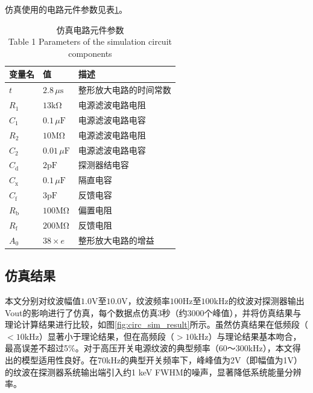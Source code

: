 \documentclass{ctexart}
\begin{document}
仿真使用的电路元件参数见表\ref{tab:params}。

\begin{table}[!h]
    \centering
    \caption{仿真电路元件参数 \\ Table 1 Parameters of the simulation circuit components}
    \label{tab:params}
    \begin{tabular}{lll}
        \hline
        变量名 & 值 & 描述 \\
        \hline
        $t$ & $2.8\,\mu\mathrm{s}$ & 整形放大电路的时间常数 \\
        $R_1$ & $13 \mathrm{k\Omega}$ & 电源滤波电路电阻 \\
        $C_1$ & $0.1\,\mu\mathrm{F}$ & 电源滤波电路电容 \\
        $R_2$ & $10 \mathrm{M\Omega}$ & 电源滤波电路电阻 \\
        $C_2$ & $0.01\,\mu\mathrm{F}$ & 电源滤波电路电容 \\
        $C_{\mathrm{d}}$ & $2\text{pF}$ & 探测器结电容 \\
        $C_{\mathrm{x}}$ & $0.1\,\mu\mathrm{F}$ & 隔直电容 \\
        $C_{\mathrm{f}}$ & $3 \mathrm{pF}$ & 反馈电容 \\
        $R_{\mathrm{b}}$ & $100 \mathrm{M\Omega}$ & 偏置电阻 \\
        $R_{\mathrm{f}}$ & $200 \mathrm{M\Omega}$ & 反馈电阻 \\
        $A_0$ & $38 \times e$ & 整形放大电路的增益 \\
        \hline
    \end{tabular}
\end{table}

\subsection{仿真结果}

本文分别对纹波幅值$1.0\mathrm{V}$至$10.0\mathrm{V}$，纹波频率$100\mathrm{Hz}$至$100\mathrm{kHz}$的纹波对探测器输出Vout的影响进行了仿真，每个数据点仿真3秒（约3000个峰值），并将仿真结果与理论计算结果进行比较，如图\ref{fig:circ_sim_result}所示。虽然仿真结果在低频段（$<10\mathrm{kHz}$）显著小于理论结果，但在高频段（$>10\mathrm{kHz}$）与理论结果基本吻合，最高误差不超过5\%。对于高压开关电源纹波的典型频率（60～300kHz）\cite{15}，本文得出的模型适用性良好。在70kHz的典型开关频率下，峰峰值为2V（即幅值为1V）的纹波在探测器系统输出端引入约1 keV FWHM的噪声，显著降低系统能量分辨率。
\end{document}
